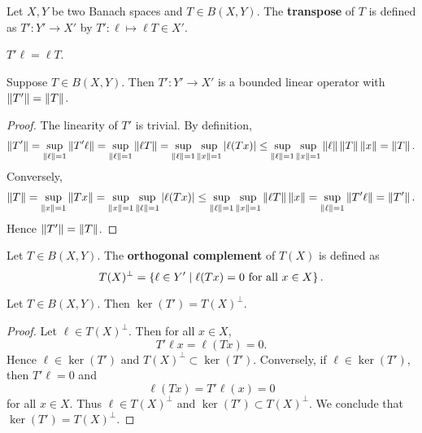\begin{definition}
    Let $X, Y$ be two Banach spaces and $T\in B(X,Y)$. The 
    \textbf{transpose} of $T$ is defined as $T': Y'\to X'$ by 
    $T':\ell\mapsto\ell T\in X'$. 
\end{definition}
\begin{remark}
    $T'\ell = \ell T$.
\end{remark}

\begin{proposition}
    Suppose $T\in B(X,Y)$. Then $T':Y'\to X'$ is a bounded linear operator 
    with $\left\lVert {T'} \right\rVert = \left\lVert {T} \right\rVert$.
\end{proposition}
\begin{proof}
    The linearity of $T'$ is trivial. By definition, 
    \begin{equation*}
            \left\lVert {T'} \right\rVert = \sup_{\left\lVert {\ell} \right\rVert = 1}\left\lVert {T'\ell} \right\rVert 
            = \sup_{\left\lVert {\ell} \right\rVert = 1}\left\lVert {\ell T} \right\rVert 
            = \sup_{\left\lVert {\ell} \right\rVert = 1}\sup_{\left\lVert {x} \right\rVert = 1}\left\lvert {\ell(Tx)} \right\rvert
            \leq \sup_{\left\lVert {\ell} \right\rVert = 1}\sup_{\left\lVert {x} \right\rVert = 1}\left\lVert {\ell} \right\rVert\left\lVert {T} \right\rVert\left\lVert {x} \right\rVert 
            = \left\lVert {T} \right\rVert.
    \end{equation*}
    Conversely, 
    \begin{equation*}
        \left\lVert {T} \right\rVert = \sup_{\left\lVert {x} \right\rVert = 1}\left\lVert {Tx} \right\rVert 
        = \sup_{\left\lVert {x} \right\rVert = 1}\sup_{\left\lVert {\ell} \right\rVert = 1}\left\lvert {\ell(Tx)} \right\rvert 
        \leq \sup_{\left\lVert {\ell} \right\rVert = 1}\sup_{\left\lVert {x} \right\rVert = 1}\left\lVert {\ell T} \right\rVert\left\lVert {x} \right\rVert
        = \sup_{\left\lVert {\ell} \right\rVert = 1}\left\lVert {T'\ell} \right\rVert = \left\lVert {T'} \right\rVert.
    \end{equation*}
    Hence $\left\lVert {T'} \right\rVert = \left\lVert {T} \right\rVert$.
\end{proof}

\begin{definition}
    Let $T\in B(X,Y)$. The \textbf{orthogonal complement} of $T(X)$ is 
    defined as 
    \begin{equation*}
        T(X)^\perp = \left\{ \ell\in Y' \;\middle\vert\; \ell(Tx) = 0 \text{ for all } x\in X \right\}.
    \end{equation*}
\end{definition}

\begin{proposition}
    Let $T\in B(X,Y)$. Then $\ker(T') = T(X)^\perp$.
\end{proposition}
\begin{proof}
    Let $\ell\in T(X)^\perp$. Then for all $x\in X$, 
    \begin{equation*}
        T'\ell x = \ell(Tx) = 0.
    \end{equation*}
    Hence $\ell\in\ker(T')$ and $T(X)^\perp\subset\ker(T')$. 
    Conversely, if $\ell\in\ker(T')$, then $T'\ell = 0$ and 
    \begin{equation*}
        \ell(Tx) = T'\ell(x) = 0
    \end{equation*}
    for all $x\in X$. Thus $\ell\in T(X)^\perp$ and 
    $\ker(T')\subset T(X)^\perp$. We conclude that 
    $\ker(T') = T(X)^\perp$.
\end{proof}